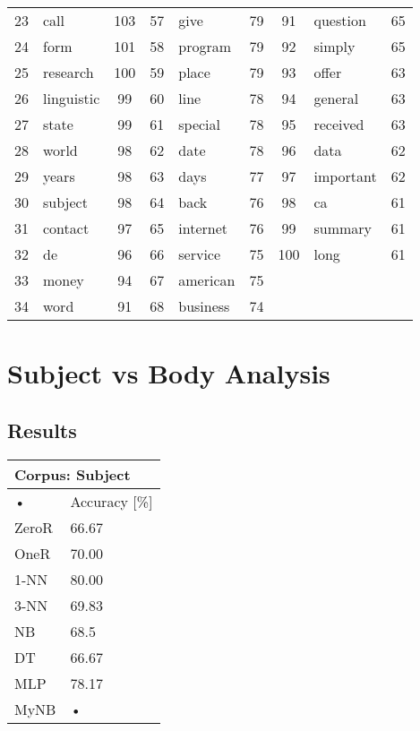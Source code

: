 \documentclass[10pt, a4paper]{article}
\begin{document}
\begin{table}[H]
\begin{tabular}{|c|l|c||c|l|c||c|l|c|}
23 & call & 103 & 57 & give & 79 & 91 & question & 65 \\
24 & form & 101 & 58 & program & 79 & 92 & simply & 65 \\
25 & research & 100 & 59 & place & 79 & 93 & offer & 63 \\
26 & linguistic & 99 & 60 & line & 78 & 94 & general & 63 \\
27 & state & 99 & 61 & special & 78 & 95 & received & 63 \\
28 & world & 98 & 62 & date & 78 & 96 & data & 62 \\
29 & years & 98 & 63 & days & 77 & 97 & important & 62 \\
30 & subject & 98 & 64 & back & 76 & 98 & ca & 61 \\
31 & contact & 97 & 65 & internet & 76 & 99 & summary & 61 \\
32 & de & 96 & 66 & service & 75 & 100 & long & 61 \\
33 & money & 94 & 67 & american & 75 &  &  &  \\
34 & word & 91 & 68 & business & 74 &  &  &  \\
\hline
\end{tabular}
\label{table:bodycorpus}
\end{table}

\section{Subject vs Body Analysis}

\subsection{Results}

\begin{tabular}{|l|l|}
\hline
\multicolumn{2}{|l|}{Corpus: Subject} \\
\hline
• & Accuracy [\%] \\
\hline
ZeroR & 66.67 \\
\hline
OneR & 70.00 \\
\hline
1-NN & 80.00 \\
\hline
3-NN & 69.83 \\
\hline
NB & 68.5 \\
\hline
DT & 66.67 \\
\hline
MLP & 78.17 \\
\hline
MyNB & • \\
\hline
\end{tabular}
\end{document}
